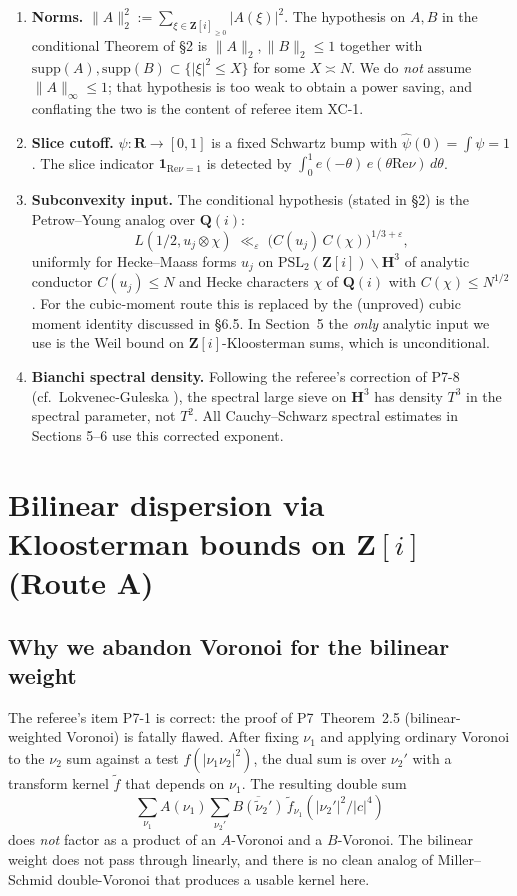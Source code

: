 \documentclass[11pt]{article}
\theoremstyle{definition}
\newcommand{\Z}{\mathbf{Z}}
\newcommand{\Q}{\mathbf{Q}}
\newcommand{\R}{\mathbf{R}}
\newcommand{\HH}{\mathbf{H}}
\newcommand{\Zi}{\Z[i]}
\renewcommand{\Re}{\mathrm{Re}}
\begin{document}
\begin{enumerate}[label=(C\arabic*)]
\item \textbf{Norms.} $\|A\|_2^2:=\sum_{\xi\in\Zi_{\ge 0}}|A(\xi)|^2$. The hypothesis on $A,B$ in the conditional Theorem of \S2 is $\|A\|_2,\|B\|_2\le 1$ together with $\mathrm{supp}(A),\mathrm{supp}(B)\subset\{|\xi|^2\le X\}$ for some $X\asymp N$. We do \emph{not} assume $\|A\|_\infty\le 1$; that hypothesis is too weak to obtain a power saving, and conflating the two is the content of referee item XC-1.
\item \textbf{Slice cutoff.} $\psi:\R\to[0,1]$ is a fixed Schwartz bump with $\widehat\psi(0)=\int\psi=1$. The slice indicator $\mathbf{1}_{\Re\nu=1}$ is detected by $\int_0^1 e(-\theta)\,e(\theta\Re\nu)\,d\theta$.
\item \textbf{Subconvexity input.} The conditional hypothesis (stated in \S2) is the Petrow--Young analog over $\Q(i)$:
\begin{equation}\label{eq:H-PY}
\tag{H-PY}
L(1/2,u_j\otimes\chi)\;\ll_\varepsilon\;\bigl(C(u_j)\,C(\chi)\bigr)^{1/3+\varepsilon},
\end{equation}
uniformly for Hecke--Maass forms $u_j$ on $\mathrm{PSL}_2(\Zi)\backslash\HH^3$ of analytic conductor $C(u_j)\le N$ and Hecke characters $\chi$ of $\Q(i)$ with $C(\chi)\le N^{1/2}$. For the cubic-moment route this is replaced by the (unproved) cubic moment identity discussed in \S6.5. In Section~5 the \emph{only} analytic input we use is the Weil bound on $\Zi$-Kloosterman sums, which is unconditional.
\item \textbf{Bianchi spectral density.} Following the referee's correction of P7-8 (cf.\ Lokvenec-Guleska \cite{LG}), the spectral large sieve on $\HH^3$ has density $T^3$ in the spectral parameter, not $T^2$. All Cauchy--Schwarz spectral estimates in Sections 5--6 use this corrected exponent.
\end{enumerate}

\section{Bilinear dispersion via Kloosterman bounds on \texorpdfstring{$\Z[i]$}{Z[i]} (Route A)}\label{sec:dispersion}

\subsection{Why we abandon Voronoi for the bilinear weight}

The referee's item P7-1 is correct: the proof of P7~Theorem~2.5 (bilinear-weighted Voronoi) is fatally flawed. After fixing $\nu_1$ and applying ordinary Voronoi to the $\nu_2$ sum against a test $f(|\nu_1\nu_2|^2)$, the dual sum is over $\nu_2'$ with a transform kernel $\widetilde f$ that depends on $\nu_1$. The resulting double sum
\[
\sum_{\nu_1}A(\nu_1)\sum_{\nu_2'}\overline{B(\widetilde\nu_2')}\,\widetilde f_{\nu_1}(|\nu_2'|^2/|c|^4)
\]
does \emph{not} factor as a product of an $A$-Voronoi and a $B$-Voronoi. The bilinear weight does not pass through linearly, and there is no clean analog of Miller--Schmid double-Voronoi that produces a usable kernel here.
\end{document}
